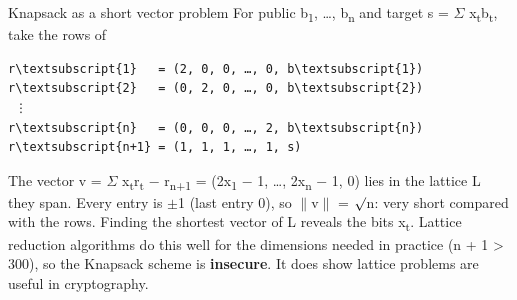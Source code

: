 \documentclass[11pt,a4paper]{article}
\begin{document}
\begin{concept}{Knapsack as a short vector problem}
For public b\textsubscript{1}, \ldots{}, b\textsubscript{n} and target s = \ensuremath{\Sigma} x\textsubscript{t}b\textsubscript{t}, take the rows of\par
\begin{workbox}
\begin{Verbatim}[commandchars=\\\{\},fontsize=\footnotesize]
r\textsubscript{1}   = (2, 0, 0, …, 0, b\textsubscript{1})
r\textsubscript{2}   = (0, 2, 0, …, 0, b\textsubscript{2})
 ⋮
r\textsubscript{n}   = (0, 0, 0, …, 2, b\textsubscript{n})
r\textsubscript{n+1} = (1, 1, 1, …, 1, s)
\end{Verbatim}
\end{workbox}
The vector v = \ensuremath{\Sigma} x\textsubscript{t}r\textsubscript{t} \ensuremath{-} r\textsubscript{n+1} = (2x\textsubscript{1} \ensuremath{-} 1, \ldots{}, 2x\textsubscript{n} \ensuremath{-} 1, 0) lies in the lattice L they span. Every entry is \ensuremath{\pm}1 (last entry 0), so \ensuremath{\|}v\ensuremath{\|} = \ensuremath{\surd}n: very short compared with the rows. Finding the shortest vector of L reveals the bits x\textsubscript{t}. Lattice reduction algorithms do this well for the dimensions needed in practice (n + 1 > 300), so the Knapsack scheme is \textbf{insecure}. It does show lattice problems are useful in cryptography.\par
\end{concept}
\end{document}
